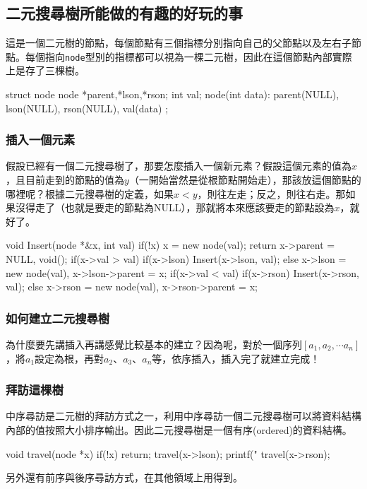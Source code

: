 \documentclass[main.tex]{subfiles}
\begin{document}
 \subsection{二元搜尋樹所能做的有趣的好玩的事}
這是一個二元樹的節點，每個節點有三個指標分別指向自己的父節點以及左右子節點。每個指向\texttt{node}型別的指標都可以視為一棵二元樹，因此在這個節點內部實際上是存了三棵樹。
 \begin{C++}
struct node {
    node *parent,*lson,*rson;
    int val;
    node(int data):
    	parent(NULL), lson(NULL), rson(NULL), val(data){}
};
 \end{C++}
 \subsubsection{插入一個元素}
 假設已經有一個二元搜尋樹了，那要怎麼插入一個新元素？假設這個元素的值為$x$，且目前走到的節點的值為$y$（一開始當然是從根節點開始走），那該放這個節點的哪裡呢？根據二元搜尋樹的定義，如果$x < y$，則往左走；反之，則往右走。那如果沒得走了（也就是要走的節點為NULL），那就將本來應該要走的節點設為$x$，就好了。
 \begin{C++}
void Insert(node *&x, int val) {
    if(!x) {
        x = new node(val);
        return x->parent = NULL, void();
    }
    if(x->val > val){
        if(x->lson) Insert(x->lson, val);
        else x->lson =
            new node(val), x->lson->parent = x;
    }
    if(x->val < val){
        if(x->rson) Insert(x->rson, val);
        else x->rson =
            new node(val), x->rson->parent = x;
    }
}
 \end{C++}
 \subsubsection{如何建立二元搜尋樹}
 為什麼要先講插入再講感覺比較基本的建立？因為呢，對於一個序列$[a_1, a_2, \cdots a_n]$，將$a_1$設定為根，再對$a_2$、$a_3$、$a_n$等，依序插入，插入完了就建立完成！
 \subsubsection{拜訪這棵樹}
 中序尋訪是二元樹的拜訪方式之一，利用中序尋訪一個二元搜尋樹可以將資料結構內部的值按照大小排序輸出。因此二元搜尋樹是一個有序(ordered)的資料結構。
 \begin{C++}
void travel(node *x){
    if(!x) return;
    travel(x->lson);
    printf("%
    travel(x->rson);
}
 \end{C++}
\indent\indent 另外還有前序與後序尋訪方式，在其他領域上用得到。
\end{document}

